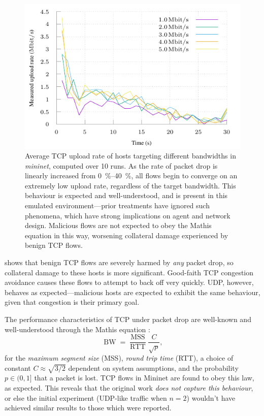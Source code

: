 \documentclass[conference, letterpaper, 10pt, times]{IEEEtran}
\begin{document}
\begin{figure}
	\includegraphics[width=\linewidth]{../plots/mplex}
	\caption{
		Average TCP upload rate of hosts targeting different bandwidths in \emph{mininet}, computed over 10 runs.
		As the rate of packet drop is linearly increased from \SIrange{0}{40}{\percent}, all flows begin to converge on an extremely low upload rate, regardless of the target bandwidth.
		This behaviour is expected and well-understood, and is present in this emulated environment---prior treatments have ignored such phenomena, which have strong implications on agent and network design.
		Malicious flows are not expected to obey the Mathis equation in this way, worsening collateral damage experienced by benign TCP flows.
		\label{fig:mplex-tcp}
	}
\end{figure}

 shows that benign TCP flows are severely harmed by \emph{any} packet drop, so collateral damage to these hosts is more significant.
Good-faith TCP congestion avoidance causes these flows to attempt to back off very quickly.
UDP, however, behaves as expected---malicious hosts are expected to exhibit the same behaviour, given that congestion is their primary goal.

The performance characteristics of TCP under packet drop  are well-known and well-understood through the Mathis equation \cite{DBLP:journals/ccr/MathisSMO97}:
\begin{equation}
\operatorname{BW} = \frac{\operatorname{MSS}}{\operatorname{RTT}} \frac{C}{\sqrt{p}},
\end{equation}
for the \emph{maximum segment size} (MSS), \emph{round trip time} (RTT), a choice of constant $C \approx{} \sqrt{3/2}$ dependent on system assumptions, and the probability $p \in (0, 1]$ that a packet is lost.
TCP flows in Mininet are found to obey this law, as expected.
This reveals that the original work \emph{does not capture this behaviour}, or else the initial experiment (UDP-like traffic when $n=2$) wouldn't have achieved similar results to those which were reported.
\end{document}
